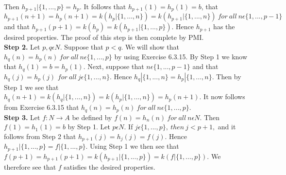 \documentclass[a4paper,10pt]{report}
\begin{document}
Then $h_{p+1} |\{1,...,p\} = h_p$. It follows that $h_{p+1}(1) = h_p(1)=b$, that $h_{p+1}(n + 1) = h_p(n+1) = k(h_p |\{1,...,n\})=k(h_{p+1} |\{1,...,n\})~ for~ all~ n\epsilon \{1,. . ., p − 1\}$ and that $h_{p+1}(p +1) = k(h_p) = k(h_{p+1} |\{1,...,p\})$. Hence $h_{p+1}$ has the desired properties. The proof of this step is then complete by PMI.
\\
{\bf Step 2.} Let $p,q\epsilon N$. Suppose that $p<q$. We will show that $h_q(n) = h_p(n)~ for~ all~n\epsilon \{1, . . ., p\}$ by using Exercise 6.3.15. By Step 1 we know that $h_q(1) = b = h_p(1).$ Next, suppose that $n\epsilon \{1, . . ., p − 1\}$ and that $h_q(j)=h_p(j)$ $for~ all~j\epsilon \{1, . . ., n\}.$ Hence $h_q|\{1,...,n\} = h_p |\{1,...,n\}$. Then by Step 1 we see that $h_q(n+1)=k(h_q |\{1,...,n\})=k(h_p |\{1,...,n\})=h_p(n+1)$. It now follows from Exercise 6.3.15 that $h_q(n)=h_p(n)~for~all~n\epsilon \{1, . . ., p\}.$\\
{\bf Step 3.} Let $f:N\rightarrow A$ be defined by $f(n) = h_n(n)~ for~ all~ n\epsilon N$. Then $f(1)=h_1(1)=b$ by Step 1. Let $p\epsilon N$. If $j\epsilon \{1, . . ., p\}, ~then~ j < p + 1,$ and it follows from Step 2 that $h_{p+1}(j)=h_j(j)=f(j)$. Hence $h_{p+1}|\{1,...,p\}=f|\{1,...,p\}$. Using Step 1 we then see that $f(p + 1) = h_{p+1}(p + 1) = k(h_{p+1} |\{1,...,p\})=k(f|\{1,...,p\})$. We therefore see that $f$ satisfies the desired properties.
\end{document}

